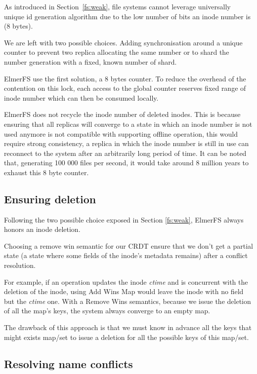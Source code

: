 \documentclass[sigconf, anonymous, 10pt]{acmart}
\begin{document}
As introduced in Section~\ref{fs:weak}, file systems cannot leverage
universally unique id generation algorithm due to the low number of bits
an inode number is (8 bytes).

We are left with two possible choices. Adding synchronisation around a unique
counter to prevent two replica allocating the same number or to shard the number generation
with a fixed, known number of shard.

ElmerFS use the first solution, a 8 bytes counter.
To reduce the overhead of the contention on this lock, each access to the global counter
reserves fixed range of inode number which can then be consumed locally.

ElmerFS does not recycle the inode number of deleted inodes.
This is because ensuring that all replicas will converge to a state in which
an inode number is not used anymore is not compatible with supporting offline
operation, this would require strong consistency, a replica in which the inode number
is still in use can reconnect to the system after an arbitrarily long period of time.
It can be noted that, generating 100 000 files per second, it would take around
8 million years to exhaust this 8 byte counter.

\subsection{Ensuring deletion}

\label{sec:deletion}
Following the two possible choice exposed in Section \ref{fs:weak}, ElmerFS always honors
an inode deletion.

Choosing a remove win semantic for our CRDT ensure that we don't get a partial
state (a state where some fields of the inode's metadata remains) after a conflict resolution.

For example, if an operation updates the inode \textit{ctime} and is concurrent with the deletion of the inode,
using Add Wins Map would leave the inode with no field but the \textit{ctime} one. With a Remove Wins semantics, because
we issue the deletion of all the map's keys, the system always converge to an empty map.

The drawback of this approach is that we must know in advance all the keys that might exists map/set to issue a deletion for all the possible keys of this map/set.

\subsection{Resolving name conflicts}
\end{document}
